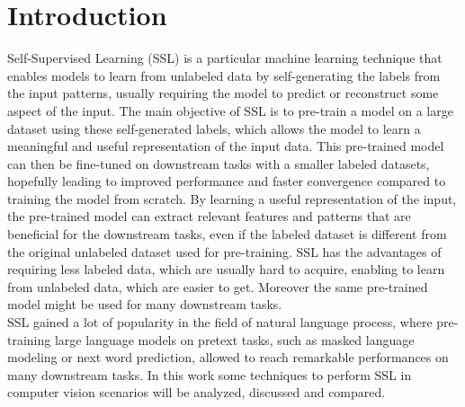 \documentclass[12pt]{article}
\begin{document}
	\section{Introduction}
	Self-Supervised Learning (SSL) is a particular machine learning technique that enables models to learn from unlabeled data by self-generating the labels from the input patterns, usually requiring the model to predict or reconstruct some aspect of the input. The main objective of SSL is to pre-train a model on a large dataset using these self-generated labels, which allows the model to learn a meaningful and useful representation of the input data. This pre-trained model can then be fine-tuned on downstream tasks with a smaller labeled datasets, hopefully leading to improved performance and faster convergence compared to training the model from scratch. By learning a useful representation of the input, the pre-trained model can extract relevant features and patterns that are beneficial for the downstream tasks, even if the labeled dataset is different from the original unlabeled dataset used for pre-training. SSL has the advantages of requiring less labeled data, which are usually hard to acquire, enabling to learn from unlabeled data, which are easier to get. Moreover the same pre-trained model might be used for many downstream tasks.\\
	SSL gained a lot of popularity in the field of natural language process, where pre-training large language models on pretext tasks, such as masked language modeling or next word prediction, allowed to reach remarkable performances on many downstream tasks. In this work some techniques to perform SSL in computer vision scenarios will be analyzed, discussed and compared.
	
\end{document}
